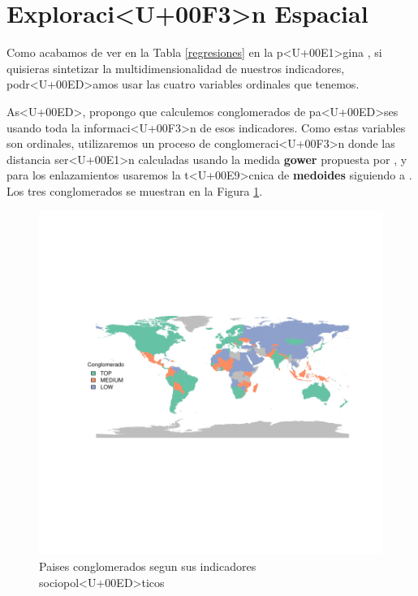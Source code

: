 \documentclass{article}
\begin{document}
\section{Exploraci<U+00F3>n Espacial}

Como acabamos de ver en la Tabla \ref{regresiones} en la p<U+00E1>gina \pageref{regresiones}, si quisieras sintetizar la multidimensionalidad de nuestros indicadores, podr<U+00ED>amos usar las cuatro variables ordinales que tenemos. 

As<U+00ED>, propongo que calculemos conglomerados de pa<U+00ED>ses usando toda la informaci<U+00F3>n de esos indicadores. Como estas variables son ordinales, utilizaremos un proceso de conglomeraci<U+00F3>n donde las distancia ser<U+00E1>n calculadas usando la medida {\bf gower} 
propuesta por \cite{gower_general_1971}
, y para los enlazamientos usaremos la t<U+00E9>cnica de {\bf medoides} 
siguiendo a \cite{reynolds_clustering_2006}
. Los tres conglomerados se muestran en la Figura \ref{clustmap}.






\begin{figure}[h]
\centering
\begin{adjustbox}{width=11cm,height=8cm,clip,trim=1cm 2.5cm 0cm 2.5cm}
\includegraphics{paperVersion_6-plotMap1}
\end{adjustbox}
\caption{Paises conglomerados segun sus indicadores sociopol<U+00ED>ticos}\label{clustmap}
\end{figure}



\end{document}

